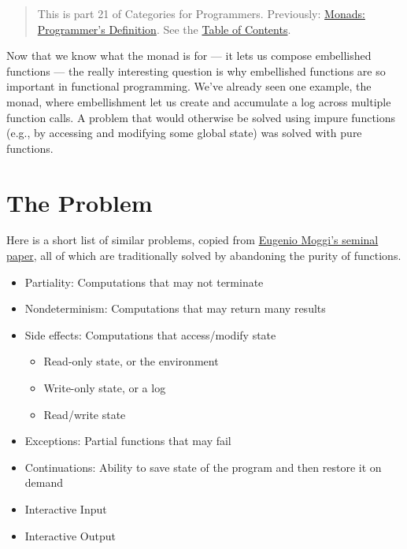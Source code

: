 \begin{quote}
This is part 21 of Categories for Programmers. Previously:
\href{https://bartoszmilewski.com/2016/11/21/monads-programmers-definition/}{Monads:
Programmer's Definition}. See the
\href{https://bartoszmilewski.com/2014/10/28/category-theory-for-programmers-the-preface/}{Table
of Contents}.
\end{quote}

Now that we know what the monad is for --- it lets us compose
embellished functions --- the really interesting question is why
embellished functions are so important in functional programming. We've
already seen one example, the  monad, where embellishment
let us create and accumulate a log across multiple function calls. A
problem that would otherwise be solved using impure functions (e.g., by
accessing and modifying some global state) was solved with pure
functions.

\section{The Problem}\label{the-problem}

Here is a short list of similar problems, copied from
\href{https://core.ac.uk/download/pdf/21173011.pdf}{Eugenio Moggi's
seminal paper}, all of which are traditionally solved by abandoning the
purity of functions.

\begin{itemize}
\tightlist
\item
  Partiality: Computations that may not terminate
\item
  Nondeterminism: Computations that may return many results
\item
  Side effects: Computations that access/modify state

  \begin{itemize}
  \tightlist
  \item
    Read-only state, or the environment
  \item
    Write-only state, or a log
  \item
    Read/write state
  \end{itemize}
\item
  Exceptions: Partial functions that may fail
\item
  Continuations: Ability to save state of the program and then restore
  it on demand
\item
  Interactive Input
\item
  Interactive Output
\end{itemize}

